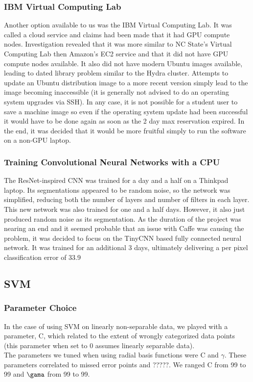 \documentclass[12pt]{article}
\begin{document}
\subsubsection{IBM Virtual Computing Lab}
	Another option available to us was the IBM Virtual Computing Lab. It was called a cloud service and claims had been made that it had GPU compute nodes.  Investigation revealed that it was more similar to NC State's Virtual Computing Lab then Amazon's EC2 service and that it did not have GPU compute nodes available.  It also did not have modern Ubuntu images available, leading to dated library problem similar to the Hydra cluster.  Attempts to update an Ubuntu distribution image to a more recent version simply lead to the image becoming inaccessible (it is generally not advised to do an operating system upgrades via SSH).  In any case, it is not possible for a student user to save a machine image so even if the operating system update had been successful it would have to be done again as soon as the 2 day max reservation expired.  In the end, it was decided that it would be more fruitful simply to run the software on a non-GPU laptop.

\subsubsection{Training Convolutional Neural Networks with a CPU}

	The ResNet-inspired CNN was trained for a day and a half on a Thinkpad laptop.  Its segmentations appeared to be random noise, so the network was simplified, reducing both the number of layers and  number of filters in each layer.  This new network was also trained for one and a half days.  However, it also just produced random noise as its segmentation.  As the duration of the project was nearing an end and it seemed probable that an issue with Caffe was causing the problem, it was decided to focus on the TinyCNN based fully connected neural network.  It was trained for an additional 3 days, ultimately delivering a per pixel classification error of 33.9%
	\subsection{SVM}
	\subsubsection{Parameter Choice} In the case of using SVM on linearly non-separable data, we played with a parameter, C, which related to the extent of wrongly categorized data points (this parameter when set to 0 assumes linearly separable data).\\
	The parameters we tuned when using radial basis functions were C and $\gamma$. These parameters correlated to missed error points and ?????.  We ranged C from 99 to 99 and $\gama$ from 99 to 99.
\end{document}
